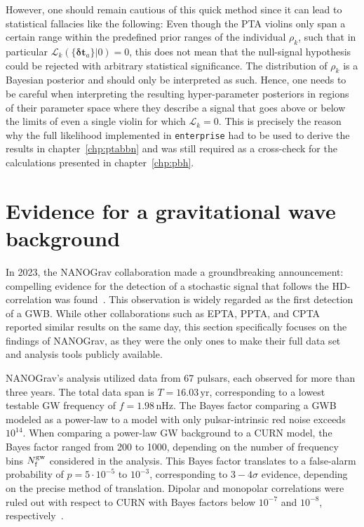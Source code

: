 However, one should remain cautious of this quick method since it can lead to statistical fallacies like the following: Even though the \ac{PTA} violins  only span a certain range within the predefined prior ranges of the individual $\rho_k$, such that in particular $\mathcal{L}_k(\{ \bm{\delta t}_a\} | 0) = 0$, this does not mean that the null-signal hypothesis could be rejected with arbitrary statistical significance. The distribution of  $\rho_k$ is a Bayesian posterior and should only be interpreted as such. Hence, one needs to be careful when interpreting the resulting hyper-parameter posteriors in regions of their parameter space where they describe a signal that goes above or below the limits of even a single violin for which $\mathcal{L}_k = 0$. This is precisely the reason why the full likelihood implemented in \texttt{enterprise} had to be used to derive the results in chapter~\ref{chp:ptabbn} and was still required as a cross-check for the calculations presented in chapter~\ref{chp:pbh}.


\section{Evidence for a gravitational wave background} \label{sec:evidenceGWB}

In 2023, the \ac{NANOGrav} collaboration made a groundbreaking announcement: compelling evidence for the detection of a stochastic signal that follows the \ac{HD}-correlation was found~\cite{NANOGrav:2023gor}.  This observation is widely regarded as the first detection of a \ac{GWB}. While other collaborations such as \acs{EPTA}\cite{EPTA:2023fyk}, \acs{PPTA}\cite{Reardon:2023gzh}, and \acs{CPTA}\cite{Xu:2023wog} reported similar results on the same day, this section specifically focuses on the findings of \ac{NANOGrav}, as they were the only ones to make their full data set and analysis tools publicly available.

\ac{NANOGrav}’s analysis utilized data from 67 pulsars, each observed for more than three years. The total data span is $T = 16.03 \, \text{yr}$, corresponding to a lowest testable \ac{GW} frequency of $f = 1.98 \, \text{nHz}$. The Bayes factor comparing a \ac{GWB} modeled as a power-law to a model with only pulsar-intrinsic red noise exceeds $10^{14}$. When comparing a  power-law \ac{GW} background to a \ac{CURN} model, the Bayes factor ranged from 200 to 1000, depending on the number of frequency bins $N_\text{f}^{\text{gw}}$ considered in the analysis. This Bayes factor translates to a false-alarm probability of $p = 5 \cdot 10^{-5}$ to $10^{-3}$, corresponding to $3-4\sigma$ evidence, depending on the precise method of translation. Dipolar and monopolar correlations were ruled out with respect to \ac{CURN} with Bayes factors below $10^{-7}$ and $10^{-8}$, respectively~\cite{NANOGrav:2023gor}.

